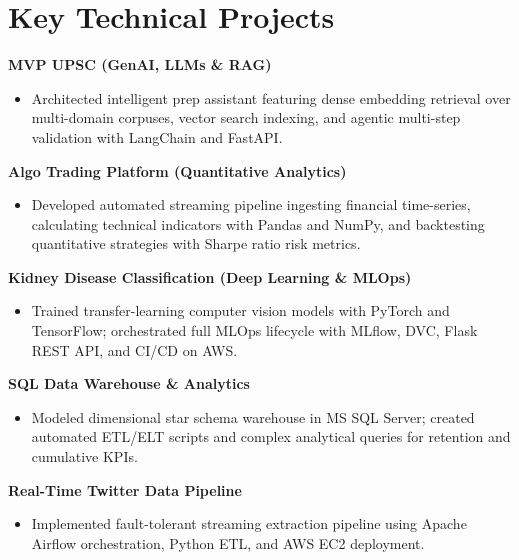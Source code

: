 \documentclass[11pt,a4paper,sans]{moderncv}
\begin{document}
\section{Key Technical Projects}
\vspace{1pt}

\textbf{MVP UPSC (GenAI, LLMs \& RAG)}
\begin{itemize}
    \item {Architected intelligent prep assistant featuring dense embedding retrieval over multi-domain corpuses, vector search indexing, and agentic multi-step validation with LangChain and FastAPI.}
\end{itemize}

\vspace{2pt}
\textbf{Algo Trading Platform (Quantitative Analytics)}
\begin{itemize}
    \item {Developed automated streaming pipeline ingesting financial time-series, calculating technical indicators with Pandas and NumPy, and backtesting quantitative strategies with Sharpe ratio risk metrics.}
\end{itemize}

\vspace{2pt}
\textbf{Kidney Disease Classification (Deep Learning \& MLOps)}
\begin{itemize}
    \item {Trained transfer-learning computer vision models with PyTorch and TensorFlow; orchestrated full MLOps lifecycle with MLflow, DVC, Flask REST API, and CI/CD on AWS.}
\end{itemize}

\vspace{2pt}
\textbf{SQL Data Warehouse \& Analytics}
\begin{itemize}
    \item {Modeled dimensional star schema warehouse in MS SQL Server; created automated ETL/ELT scripts and complex analytical queries for retention and cumulative KPIs.}
\end{itemize}

\vspace{2pt}
\textbf{Real-Time Twitter Data Pipeline}
\begin{itemize}
    \item {Implemented fault-tolerant streaming extraction pipeline using Apache Airflow orchestration, Python ETL, and AWS EC2 deployment.}
\end{itemize}
\end{document}
